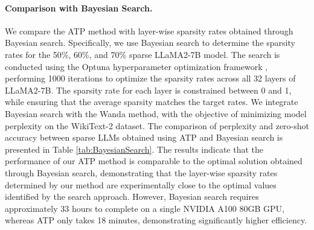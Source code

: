 \paragraph{Comparison with Bayesian Search.}
We compare the ATP method with layer-wise sparsity rates obtained through Bayesian search. Specifically, we use Bayesian search to determine the sparsity rates for the 50$\%$, 60$\%$, and 70$\%$ sparse LLaMA2-7B model. The search is conducted using the Optuna hyperparameter optimization framework \citep{akiba2019optuna}, performing 1000 iterations to optimize the sparsity rates across all 32 layers of LLaMA2-7B. The sparsity rate for each layer is constrained between 0 and 1, while ensuring that the average sparsity matches the target rates. We integrate Bayesian search with the Wanda method, with the objective of minimizing model perplexity on the WikiText-2 dataset. The comparison of perplexity and zero-shot accuracy between sparse LLMs obtained using ATP and Bayesian search is presented in Table \ref{tab:BayesianSearch}. The results indicate that the performance of our ATP method is comparable to the optimal solution obtained through Bayesian search, demonstrating that the layer-wise sparsity rates determined by our method are experimentally close to the optimal values identified by the search approach. However, Bayesian search requires approximately 33 hours to complete on a single NVIDIA A100 80GB GPU, whereas ATP only takes 18 minutes, demonstrating significantly higher efficiency.  
\begin{table}[h!]
    \centering
    \caption{Comparison of ATP and Bayesian search.}\label{tab:BayesianSearch}
\end{table}



